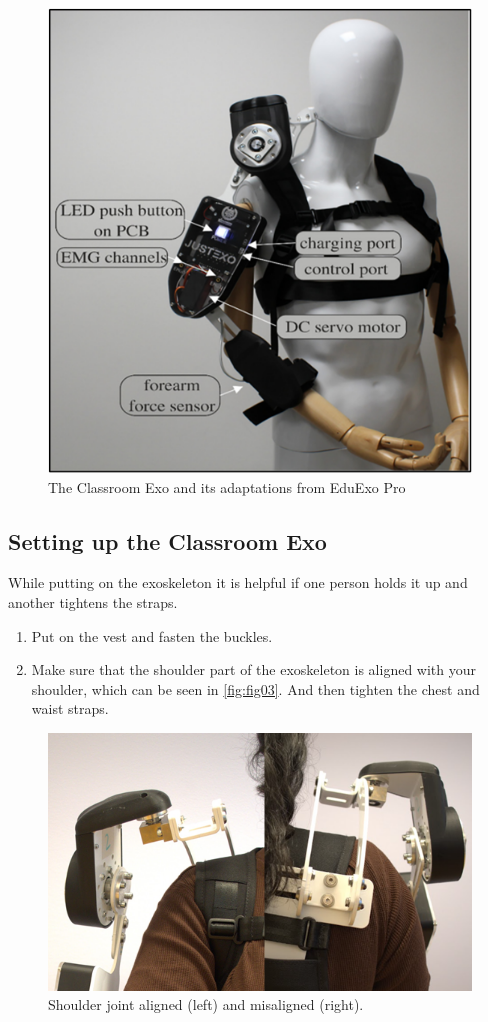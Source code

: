 \begin{figure}[H]
	\centering
	\includegraphics[width=0.7\linewidth]{img/fig_02}
	\caption{The Classroom Exo and its adaptations from EduExo Pro }
	\label{fig:fig02}
\end{figure}

\subsection{Setting up the Classroom Exo}
While putting on the exoskeleton it is helpful if one person holds it up and another tightens the straps.
\begin{enumerate}[]
	\item Put on the vest and fasten the buckles. 
	\item Make sure that the shoulder part of the exoskeleton is aligned with your shoulder, which can be seen in \autoref{fig:fig03}. And then tighten the chest and waist straps.
\end{enumerate}

\begin{figure}[H]
	\centering
	\includegraphics[width=0.4\linewidth]{img/fig_03}
	\caption{Shoulder joint aligned (left) and misaligned (right).}
	\label{fig:fig03}
\end{figure}

